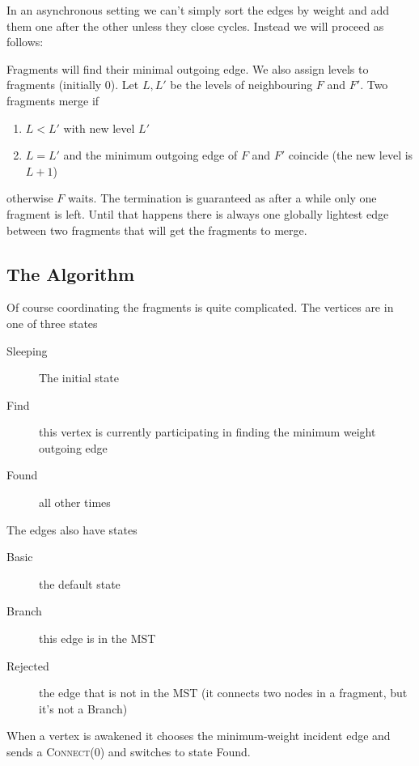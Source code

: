 In an asynchronous setting we can't simply sort the edges by weight and add them one after the other unless they close cycles. Instead we will proceed as follows:

Fragments will find their minimal outgoing edge. We also assign levels to fragments (initially 0). Let $L,L'$ be the levels of neighbouring $F$ and $F'$. Two fragments merge if 

\begin{enumerate}
\item $L<L'$ with new level $L'$
\item $L=L'$ and the minimum outgoing edge of $F$ and $F'$ coincide (the new level is $L+1$)
\end{enumerate}

otherwise $F$ waits. The termination is guaranteed as after a while only one fragment is left. Until that happens there is always one globally lightest edge between two fragments that will get the fragments to merge.

\subsection{The Algorithm}

Of course coordinating the fragments is quite complicated. The vertices are in one of three states

\begin{description}
\item[Sleeping] The initial state
\item[Find] this vertex is currently participating in finding the minimum weight outgoing edge
\item[Found] all other times
\end{description}


The edges also have states

\begin{description}
\item[Basic] the default state
\item[Branch] this edge is in the MST
\item[Rejected] the edge that is not in the MST (it connects two nodes in a fragment, but it's not a Branch)
\end{description}

When a vertex is awakened it chooses the minimum-weight incident edge and sends a {\scshape Connect(0)} and switches to state Found. 


